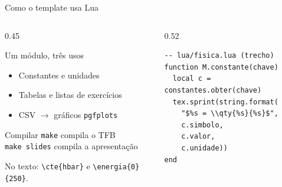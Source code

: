 \begin{frame}[fragile]{Como o template usa Lua}
  \begin{columns}[T,onlytextwidth]
    \begin{column}{0.45\textwidth}
      \begin{destaque}{Um módulo, três usos}
        \begin{itemize}
          \item Constantes e unidades
          \item Tabelas e listas de exercícios
          \item CSV $\rightarrow$ gráficos \texttt{pgfplots}
        \end{itemize}
      \end{destaque}
      \begin{destaque}[fisicaviolet]{Compilar}
        \small
        \texttt{make} compila o TFB\\[2pt]
        \texttt{make slides} compila a apresentação
      \end{destaque}
      {\scriptsize\color{fisicamuted}%
       No texto: \texttt{\textbackslash cte\{hbar\}} e
       \texttt{\textbackslash energia\{0\}\{250\}}.}
    \end{column}
    \begin{column}{0.52\textwidth}
      \begin{lstlisting}[style=lua]
-- lua/fisica.lua (trecho)
function M.constante(chave)
  local c = constantes.obter(chave)
  tex.sprint(string.format(
    "$%s = \\qty{%s}{%s}$",
    c.simbolo,
    c.valor,
    c.unidade))
end
      \end{lstlisting}
    \end{column}
  \end{columns}
\end{frame}
